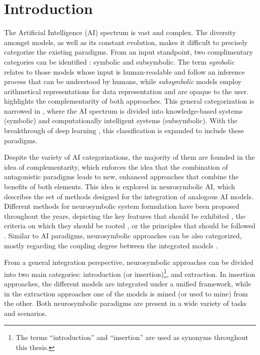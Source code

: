 \chapter{Introduction}
\label{chap:intro}
The Artificial Intelligence (AI) spectrum is vast and complex. The diversity amongst models, as well as its constant evolution, makes it difficult to precisely categorize the existing paradigms. From an input standpoint, two complimentary categories can be identified \citep{lieberman_symbolic_nodate}: symbolic and subsymbolic. The term \textit{symbolic} relates to those models whose input is human-readable and follow an inference process that can be understood by humans, while \textit{subsymbolic} models employ arithmetical representations for data representation and are opaque to the user. \cite{lieberman_symbolic_nodate} highlights the complementarity of both approaches. This general categorization is narrowed in \cite{hopgood_2009_knowledge-based}, where the AI spectrum is divided into knowledge-based systems (symbolic) and computationally intelligent systems (subsymbolic). With the breakthrough of deep learning \citep{raina_2009_gpu,glorot_2014_relu}, this classification is expanded to include these paradigms. 

Despite the variety of AI categorizations, the majority of them are founded in the idea of complementarity, which enforces the idea that the combination of antagonistic paradigms leads to new, enhanced approaches that combine the benefits of both elements. This idea is explored in neurosymbolic AI, which describes the set of methods designed for the integration of analogous AI models. Different methods for neurosymbolic system formulation have been proposed throughout the years, depicting the key features that should be exhibited \citep{mcgarry_hybrid_1999}, the criteria on which they should be rooted \citep{mira_neurosymbolic_2004}, or the principles that should be followed \citep{besold_neural-symbolic_2017}. Similar to AI paradigms, neurosymbolic approaches can be also categorized, mostly regarding the coupling degree between the integrated models \citep{medsker2020models,hilario_overview_nodate}.

From a general integration perspective, neurosymbolic approaches can be divided into two main categories: introduction (or insertion)\footnote{The terms ``introduction'' and ``insertion'' are used as synonyms throughout this thesis.}, and extraction. In insertion approaches, the different models are integrated under a unified framework, while in the extraction approaches one of the models is mined (or used to mine) from the other. Both neurosymbolic paradigms are present in a wide variety of tasks and scenarios. 

